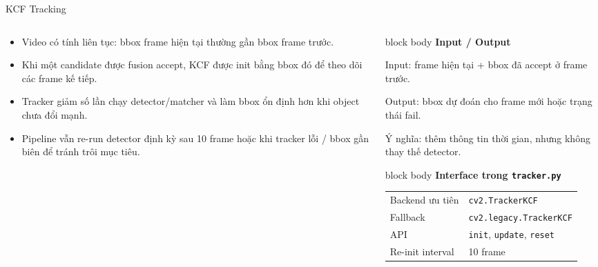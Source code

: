 \documentclass[aspectratio=169]{beamer}
\newcommand{\tightitem}{\setlength\itemsep{0.42em}}
\newenvironment{bluebox}[1]{
  \begin{beamercolorbox}[rounded=true,shadow=false,wd=\linewidth,sep=0.28cm]{block body}
  {\bfseries\color{DeepBlue}#1}\par\vspace{0.12cm}
}{
  \end{beamercolorbox}
}
\begin{document}
\begin{frame}{KCF Tracking}
  \begin{columns}[T,onlytextwidth]
    \begin{column}{0.55\textwidth}
      \begin{itemize}
        \tightitem
        \item Video có tính liên tục: bbox frame hiện tại thường gần bbox frame trước.
        \item Khi một candidate được fusion accept, KCF được init bằng bbox đó để theo dõi các frame kế tiếp.
        \item Tracker giảm số lần chạy detector/matcher và làm bbox ổn định hơn khi object chưa đổi mạnh.
        \item Pipeline vẫn re-run detector định kỳ sau 10 frame hoặc khi tracker lỗi / bbox gần biên để tránh trôi mục tiêu.
      \end{itemize}
    \end{column}
    \begin{column}{0.41\textwidth}
      \begin{bluebox}{Input / Output}
        \scriptsize
        Input: frame hiện tại + bbox đã accept ở frame trước.\par
        Output: bbox dự đoán cho frame mới hoặc trạng thái fail.\par
        Ý nghĩa: thêm thông tin thời gian, nhưng không thay thế detector.
      \end{bluebox}
      \begin{bluebox}{Interface trong \texttt{tracker.py}}
        \scriptsize
        \begin{tabular}{ll}
          Backend ưu tiên & \texttt{cv2.TrackerKCF} \\
          Fallback & \texttt{cv2.legacy.TrackerKCF} \\
          API & \texttt{init}, \texttt{update}, \texttt{reset} \\
          Re-init interval & 10 frame \\
        \end{tabular}
      \end{bluebox}
    \end{column}
  \end{columns}
\end{frame}
\end{document}
